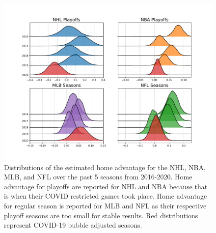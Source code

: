 \begin{figure}
	\centering
	\includegraphics[width=\textwidth]{figures/Figure_2.pdf}
	\caption{Distributions of the estimated home advantage for the NHL, NBA, MLB, and NFL over the past 5 seasons from 2016-2020. Home advantage for playoffs are reported for NHL and NBA because that is when their COVID restricted games took place. Home advantage for regular season is reported for MLB and NFL as their respective playoff seasons are too small for stable results. Red distributions represent COVID-19 bubble adjusted seasons.}
	\label{fig:ha_main}
\end{figure}
